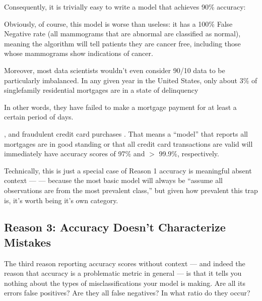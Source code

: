 \documentclass[letterpaper,10pt,english]{jupyterBook}
\begin{document}
\sphinxAtStartPar
Consequently, it is trivially easy to write a model that achieves 90\% accuracy:

\begin{sphinxVerbatim}[commandchars=\\\{\}]
 
      
     
\end{sphinxVerbatim}

\sphinxAtStartPar
Obviously, of course, this model is worse than useless: it has a 100\% False Negative rate (all mammograms that are abnormal are classified as normal), meaning the algorithm will tell  patients they are cancer free, including those whose mammograms show indications of cancer.

\sphinxAtStartPar
Moreover, most data scientists wouldn’t even consider 90/10 data to be particularly imbalanced. In any given year in the United States, only about 3\% of single\sphinxhyphen{}family residential mortgages are in a state of delinquency%
\begin{footnote}[3]\sphinxAtStartFootnote
In other words, they have failed to make a mortgage payment for at least a certain period of days.
%
\end{footnote}, and fraudulent credit card purchases . That means a “model” that reports all mortgages are in good standing or that all credit card transactions are valid will immediately have accuracy scores of 97\% and \(>\) 99.9\%, respectively.

\sphinxAtStartPar
Technically, this is just a special case of Reason 1 accuracy is meaningful absent context —  — because the most basic model will always be “assume all observations are from the most prevalent class,” but given how prevalent this trap is, it’s worth being it’s own category.


\subsection{Reason 3: Accuracy Doesn’t Characterize Mistakes}
\label{\detokenize{30_questions/24_passive_internal_errors:reason-3-accuracy-doesn-t-characterize-mistakes}}
\sphinxAtStartPar
The third reason reporting accuracy scores without context — and indeed the reason that accuracy is a problematic metric in general — is that it tells you nothing about the types of misclassifications your model is making. Are all its errors false positives? Are they all false negatives? In what ratio do they occur?
\end{document}
